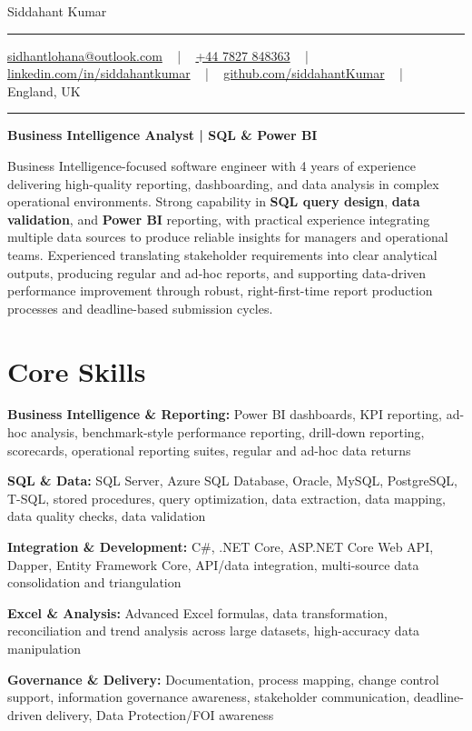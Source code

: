 \documentclass[letterpaper,10pt]{article}
\newcommand{\documentTitle}[2]{
  \begin{center}
    \vspace*{-0.3in}
    {\Huge\color{accentTitle} #1}
    \vspace{8pt}
    {\color{accentLine} \hrule}
    \vspace{2pt}
    \footnotesize{#2}
    \vspace{2pt}
    {\color{accentLine} \hrule}
  \end{center}
}
\newenvironment{resume_list}{
  \vspace{-7pt}
  \begin{itemize}[itemsep=-2px, parsep=1pt, leftmargin=30pt]
}{
  \end{itemize}
}
\begin{document}
\documentTitle{Siddahant Kumar}{
\vspace{0.1cm}
\href{mailto:sidhantlohana@outlook.com}{sidhantlohana@outlook.com} ~ | ~
\href{tel:+447827848363}{+44 7827 848363} ~ | ~
\href{https://www.linkedin.com/in/siddahantkumar/}{linkedin.com/in/siddahantkumar} ~ | ~
\href{https://github.com/siddahantKumar}{github.com/siddahantKumar} ~ | ~
England, UK
}

\begin{center}
\textbf{Business Intelligence Analyst | SQL \& Power BI}
\end{center}

Business Intelligence-focused software engineer with 4 years of experience delivering high-quality reporting, dashboarding, and data analysis in complex operational environments. Strong capability in \textbf{SQL query design}, \textbf{data validation}, and \textbf{Power BI} reporting, with practical experience integrating multiple data sources to produce reliable insights for managers and operational teams. Experienced translating stakeholder requirements into clear analytical outputs, producing regular and ad-hoc reports, and supporting data-driven performance improvement through robust, right-first-time report production processes and deadline-based submission cycles.


\section{Core Skills}

\begin{resume_list}
    \item \textbf{Business Intelligence \& Reporting:} Power BI dashboards, KPI reporting, ad-hoc analysis, benchmark-style performance reporting, drill-down reporting, scorecards, operational reporting suites, regular and ad-hoc data returns
    \item \textbf{SQL \& Data:} SQL Server, Azure SQL Database, Oracle, MySQL, PostgreSQL, T-SQL, stored procedures, query optimization, data extraction, data mapping, data quality checks, data validation
    \item \textbf{Integration \& Development:} C\#, .NET Core, ASP.NET Core Web API, Dapper, Entity Framework Core, API/data integration, multi-source data consolidation and triangulation
    \item \textbf{Excel \& Analysis:} Advanced Excel formulas, data transformation, reconciliation and trend analysis across large datasets, high-accuracy data manipulation
    \item \textbf{Governance \& Delivery:} Documentation, process mapping, change control support, information governance awareness, stakeholder communication, deadline-driven delivery, Data Protection/FOI awareness
\end{resume_list}
\end{document}
